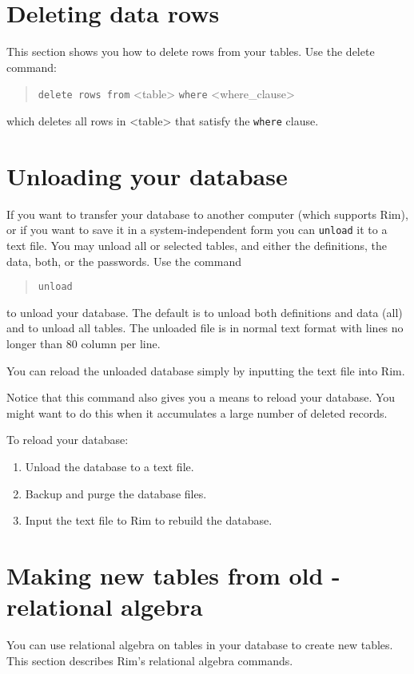 \documentclass[11pt,a4paper]{report}
\begin{document}
\section{Deleting data rows}
%
This section shows you how to delete rows from your tables.
Use the delete command:
\begin{verse}
\verb!delete rows from! <table> \verb!where! <where\_clause>
\end{verse}
which deletes all rows in <table> that
satisfy the \verb!where! clause.
 
\section{Unloading your database}
%
If you want to transfer your database to another computer (which
supports Rim), or if you want to save it in a system-inde\-pend\-ent
form you can \verb!unload! it to a text file.  You may unload
all or selected tables, and either
the definitions, the data, both, or the passwords.
Use the command
\begin{verse}
  \verb!unload!  \\
   \qquad {} 
  \end{verse}
to unload your database.  The default is to unload both definitions
and data (all) and to unload all tables.
The unloaded file is in normal text format with lines no longer
than 80 column per line.
 
You can reload the unloaded database simply by inputting the
text file into Rim.
 
\medskip
 
Notice that this command also gives you a means to reload your database.
You might want to do this when it accumulates a large number of deleted
records.
 
To reload your database:
\begin{enumerate}
\item Unload the database to a text file.
\item Backup and purge the database files.
\item Input the text file to Rim to rebuild the database.
\end{enumerate}
 
 
\section{Making new tables from old - relational algebra}
%
\label{ra-section}
 
You can use relational algebra on tables in your database
to create new tables. This section describes Rim's
relational algebra commands.
 
\end{document}

